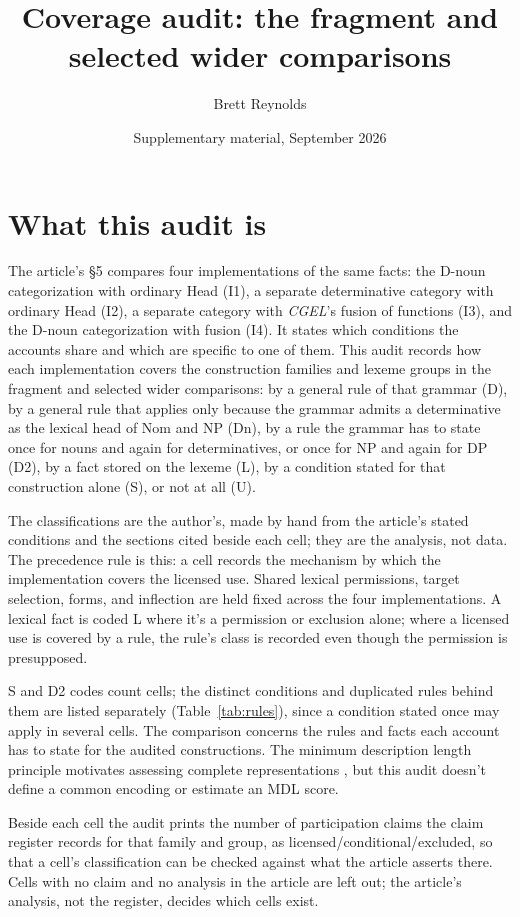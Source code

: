 \documentclass[12pt]{article}
\title{Coverage audit: the fragment and selected wider comparisons}
\author{Brett Reynolds}
\date{Supplementary material, September 2026}
\begin{document}
\maketitle

\section{What this audit is}

The article's §5 compares four implementations of the same facts: the D-noun categorization with ordinary Head (I1), a separate determinative category with ordinary Head (I2), a separate category with \textit{CGEL}'s fusion of functions (I3), and the D-noun categorization with fusion (I4). It states which conditions the accounts share and which are specific to one of them. This audit records how each implementation covers the construction families and lexeme groups in the fragment and selected wider comparisons: by a general rule of that grammar (D), by a general rule that applies only because the grammar admits a determinative as the lexical head of Nom and NP (Dn), by a rule the grammar has to state once for nouns and again for determinatives, or once for NP and again for DP (D2), by a fact stored on the lexeme (L), by a condition stated for that construction alone (S), or not at all (U).

The classifications are the author's, made by hand from the article's stated conditions and the sections cited beside each cell; they are the analysis, not data. The precedence rule is this: a cell records the mechanism by which the implementation covers the licensed use. Shared lexical permissions, target selection, forms, and inflection are held fixed across the four implementations. A lexical fact is coded L where it's a permission or exclusion alone; where a licensed use is covered by a rule, the rule's class is recorded even though the permission is presupposed.

S and D2 codes count cells; the distinct conditions and duplicated rules behind them are listed separately (Table~\ref{tab:rules}), since a condition stated once may apply in several cells. The comparison concerns the rules and facts each account has to state for the audited constructions. The minimum description length principle motivates assessing complete representations \citep{rissanen1978mdl}, but this audit doesn't define a common encoding or estimate an MDL score.

Beside each cell the audit prints the number of participation claims the claim register records for that family and group, as licensed/conditional/excluded, so that a cell's classification can be checked against what the article asserts there. Cells with no claim and no analysis in the article are left out; the article's analysis, not the register, decides which cells exist.
\end{document}
